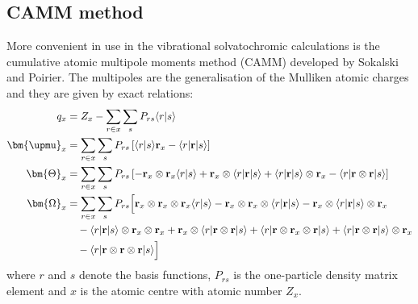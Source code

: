 \documentclass[a4paper,titlepage,twoside,fleqn,12pt]{book}
\begin{document}
\begin{appendices}
\begin{refsection}
\section{CAMM method}

More convenient in use in the vibrational solvatochromic calculations
is the cumulative atomic multipole
moments method (CAMM) developed by Sokalski and Poirier. \citep{Sokalski.Poirier.CPL.1983}
The multipoles are the generalisation of the Mulliken atomic charges
and they are given by exact relations:
%
\begin{subequations}
\begin{align}
q_x              &=Z_x -\sum_{r\in x} \sum_s  P_{rs} \langle r \rvert s \rangle \\
\bm{\upmu}_x     &= \sum_{r\in x} \sum_s  P_{rs} 
\left[
        \langle r \rvert s \rangle {\bf r}_x - \langle r \lvert {\bf r} \rvert s \rangle
\right]   \\
\bm{\Theta}_{x}  &= \sum_{r\in x} \sum_s P_{rs}
\left[
   - {\bf r}_x \otimes {\bf r}_x \langle r \rvert s \rangle +
    {\bf r}_x \otimes  \langle r \lvert {\bf r} \rvert s \rangle + 
                       \langle r \lvert {\bf r} \rvert s \rangle \otimes {\bf r}_x -
    \langle r \lvert {\bf r} \otimes {\bf r} \rvert s \rangle
\right]   \\
\bm{\Omega}_{x}  &=
\sum_{r\in x} \sum_s P_{rs}
\Big[
          {\bf r}_x \otimes {\bf r}_x \otimes {\bf r}_x \langle r \rvert s \rangle -
          {\bf r}_x \otimes {\bf r}_x \otimes \langle r \lvert {\bf r} \rvert s \rangle -
          {\bf r}_x \otimes \langle r \lvert {\bf r} \rvert s \rangle \otimes {\bf r}_x \nonumber \\ 
 &\quad- \langle r \lvert {\bf r} \rvert s \rangle \otimes {\bf r}_x \otimes {\bf r}_x +
          {\bf r}_x \otimes \langle r \lvert {\bf r} \otimes {\bf r} \rvert s \rangle +
          \langle r \lvert {\bf r} \otimes {\bf r}_x \otimes {\bf r} \rvert s \rangle +
          \langle r \lvert {\bf r} \otimes {\bf r} \rvert s \rangle \otimes {\bf r}_x \nonumber \\ 
 &\quad- \langle r \lvert {\bf r} \otimes {\bf r} \otimes {\bf r} \rvert s \rangle
\Big] 
\end{align}
\end{subequations}
%
where $r$ and $s$ denote the basis functions, $P_{rs}$ is the
one\hyp{}particle density matrix element and $x$ is the atomic centre
with atomic number $Z_x$.

\end{refsection}
\end{appendices}
\end{document}
